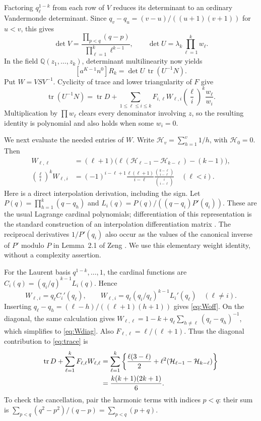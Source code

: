 \documentclass[11pt]{article}
\newcommand{\Q}{\mathbb{Q}}
\newcommand{\tr}{\operatorname{tr}}
\newcommand{\coef}[1]{\left[#1\right]}
\begin{document}
Factoring $q_\ell^{1-k}$ from each row of $V$ reduces its determinant to
an ordinary Vandermonde determinant. Since
$q_v-q_u=(v-u)/((u+1)(v+1))$ for $u<v$, this gives
\begin{equation}\label{eq:detU}
 \det V=\frac{\prod_{p<q}(q-p)}{\prod_{\ell=1}^k\ell^{k-1}},
 \qquad \det U=\lambda_k\prod_{\ell=1}^k w_\ell.
\end{equation}
In the field $\Q(z_1,\ldots,z_k)$, determinant multilinearity now yields
\[
 \coef{a^{K-1}n^0}R_k=\det U\,\tr(U^{-1}N).
\]
Put $W=VSV^{-1}$. Cyclicity of trace and lower triangularity of $F$ give
\begin{equation}\label{eq:trace}
 \tr(U^{-1}N)=\tr D+
 \sum_{1\leq\ell\leq i\leq k}
 F_{i,\ell}W_{\ell,i}\left(\frac\ell i\right)^k\frac{w_\ell}{w_i}.
\end{equation}
Multiplication by $\prod w_\ell$ clears every denominator involving $z$,
so the resulting identity is polynomial and also holds when some $w_i=0$.

We next evaluate the needed entries of $W$. Write
$\mathcal H_v=\sum_{h=1}^v1/h$, with $\mathcal H_0=0$. Then
\begin{align}
 W_{\ell,\ell}
 &= (\ell+1)\bigl(\ell(\mathcal H_{\ell-1}-\mathcal H_{k-\ell})-(k-1)\bigr),
 \label{eq:Wdiag}\\
 \left(\frac\ell i\right)^k W_{\ell,i}
 &=(-1)^{i-\ell+1}\frac{\ell(\ell+1)}{i-\ell}
 \frac{\binom{k-\ell}{i-\ell}}{\binom{i}{i-\ell}}\quad(\ell<i).
 \label{eq:Woff}
\end{align}
Here is a direct interpolation derivation, including the sign.
Let $P(q)=\prod_{h=1}^k(q-q_h)$ and
$L_i(q)=P(q)/((q-q_i)P'(q_i))$.
These are the usual Lagrange cardinal polynomials; differentiation of this
representation is the standard construction of an interpolation
differentiation matrix \cite[Sections~2 and~9.3]{BT2004}.
The reciprocal derivatives $1/P'(q_i)$ also occur as the values of the
canonical inverse of $P'$ modulo $P$ in Lemma~2.1 of
Zeng \cite{Zeng2026}. We use this elementary
weight identity, without a complexity assertion.

For the Laurent basis $q^{1-k},\ldots,1$, the cardinal functions are
$C_i(q)=(q_i/q)^{k-1}L_i(q)$. Hence
\[
 W_{\ell,i}=q_\ell C_i'(q_\ell),\qquad
 W_{\ell,i}=q_\ell(q_i/q_\ell)^{k-1}L_i'(q_\ell)\quad(\ell\ne i).
\]
Inserting $q_\ell-q_h=(\ell-h)/((\ell+1)(h+1))$ gives
\eqref{eq:Woff}. On the diagonal, the same calculation gives
$W_{\ell,\ell}=1-k+q_\ell\sum_{h\ne\ell}(q_\ell-q_h)^{-1}$,
which simplifies to \eqref{eq:Wdiag}.
Also $F_{\ell,\ell}=\ell/(\ell+1)$. Thus the diagonal contribution
to \eqref{eq:trace} is
\begin{align}
 \tr D+\sum_{\ell=1}^kF_{\ell,\ell}W_{\ell,\ell}
 &=\sum_{\ell=1}^k\left\{\frac{\ell(3-\ell)}2+
 \ell^2(\mathcal H_{\ell-1}-\mathcal H_{k-\ell})\right\}\notag\\
 &=\frac{k(k+1)(2k+1)}6.\label{eq:diagsum}
\end{align}
To check the cancellation, pair the harmonic terms with indices $p<q$:
their sum is $\sum_{p<q}(q^2-p^2)/(q-p)=\sum_{p<q}(p+q)$.
\end{document}
